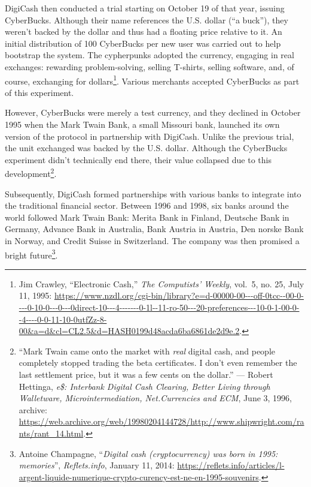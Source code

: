 \documentclass[
  a5paper,
  smalldemyvopaper,10pt,twoside,onecolumn,openright,extrafontsizes,hidelinks]{memoir}
\begin{document}
DigiCash then conducted a trial starting on October 19 of that year,
issuing CyberBucks. Although their name references the U.S. dollar (``a
buck''), they weren't backed by the dollar and thus had a floating price
relative to it. An initial distribution of 100 CyberBucks per new user
was carried out to help bootstrap the system. The cypherpunks adopted
the currency, engaging in real exchanges: rewarding problem-solving,
selling T-shirts, selling software, and, of course, exchanging for
dollars\footnote{Jim Crawley, ``Electronic Cash,'' \emph{The Computists'
  Weekly}, vol.~5, no. 25, July 11, 1995:
  \url{https://www.nzdl.org/cgi-bin/library?e=d-00000-00---off-0tcc--00-0----0-10-0---0---0direct-10---4-------0-1l--11-ro-50---20-preferences---10-0-1-00-0--4----0-0-11-10-0utfZz-8-00&a=d&cl=CL2.5&d=HASH0199d48acda6ba6861de2d9e.2}.}.
Various merchants accepted CyberBucks as part of this experiment.

However, CyberBucks were merely a test currency, and they declined in
October 1995 when the Mark Twain Bank, a small Missouri bank, launched
its own version of the protocol in partnership with DigiCash. Unlike the
previous trial, the unit exchanged was backed by the U.S. dollar.
Although the CyberBucks experiment didn't technically end there, their
value collapsed due to this development\footnote{``Mark Twain came onto
  the market with \emph{real} digital cash, and people completely
  stopped trading the beta certificates. I don't even remember the last
  settlement price, but it was a few cents on the dollar.'' --- Robert
  Hettinga, \emph{e\$: Interbank Digital Cash Clearing, Better Living
  through Walletware, Microintermediation, Net.Currencies and ECM}, June
  3, 1996, archive:
  \url{https://web.archive.org/web/19980204144728/http://www.shipwright.com/rants/rant_14.html}.}.

Subsequently, DigiCash formed partnerships with various banks to
integrate into the traditional financial sector. Between 1996 and 1998,
six banks around the world followed Mark Twain Bank: Merita Bank in
Finland, Deutsche Bank in Germany, Advance Bank in Australia, Bank
Austria in Austria, Den norske Bank in Norway, and Credit Suisse in
Switzerland. The company was then promised a bright future\footnote{Antoine
  Champagne, ``\emph{Digital cash (cryptocurrency) was born in 1995:
  memories}'', \emph{Reflets.info}, January 11, 2014:
  \url{https://reflets.info/articles/l-argent-liquide-numerique-crypto-curency-est-ne-en-1995-souvenirs}.}.
\end{document}
